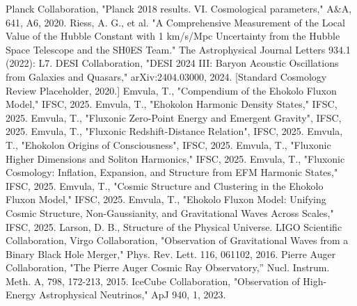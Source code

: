 \documentclass[11pt]{article}
\begin{document}

\begin{thebibliography}{99}

     Planck Collaboration, "Planck 2018 results. VI. Cosmological parameters," A\&A, 641, A6, 2020.
     Riess, A. G., et al. "A Comprehensive Measurement of the Local Value of the Hubble Constant with 1 km/s/Mpc Uncertainty from the Hubble Space Telescope and the SH0ES Team." The Astrophysical Journal Letters 934.1 (2022): L7.
     DESI Collaboration, "DESI 2024 III: Baryon Acoustic Oscillations from Galaxies and Quasars," arXiv:2404.03000, 2024.
     [Standard Cosmology Review Placeholder, 2020.]
     Emvula, T., "Compendium of the Ehokolo Fluxon Model," IFSC, 2025.
     Emvula, T., "Ehokolon Harmonic Density States," IFSC, 2025.
     Emvula, T., "Fluxonic Zero-Point Energy and Emergent Gravity", IFSC, 2025.
     Emvula, T., "Fluxonic Redshift-Distance Relation", IFSC, 2025.
     Emvula, T., "Ehokolon Origins of Consciousness", IFSC, 2025.
     Emvula, T., "Fluxonic Higher Dimensions and Soliton Harmonics," IFSC, 2025. %
     Emvula, T., "Fluxonic Cosmology: Inflation, Expansion, and Structure from EFM Harmonic States," IFSC, 2025. %
     Emvula, T., "Cosmic Structure and Clustering in the Ehokolo Fluxon Model," IFSC, 2025. %
     Emvula, T., "Ehokolo Fluxon Model: Unifying Cosmic Structure, Non-Gaussianity, and Gravitational Waves Across Scales," IFSC, 2025. %
     Larson, D. B., Structure of the Physical Universe.
     LIGO Scientific Collaboration, Virgo Collaboration, "Observation of Gravitational Waves from a Binary Black Hole Merger," Phys. Rev. Lett. 116, 061102, 2016.
     Pierre Auger Collaboration, "The Pierre Auger Cosmic Ray Observatory,” Nucl. Instrum. Meth. A, 798, 172-213, 2015.
     IceCube Collaboration, "Observation of High-Energy Astrophysical Neutrinos," ApJ 940, 1, 2023.

\end{thebibliography}
\end{document}
